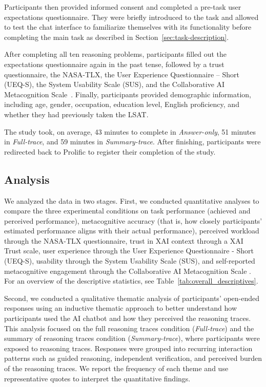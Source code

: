 \documentclass[manuscript, anonymous=false,authorversion,review=false]{acmart}
\begin{document}
Participants then provided informed consent and completed a pre-task user expectations questionnaire. They were briefly introduced to the task and allowed to test the chat interface to familiarize themselves with its functionality before completing the main task as described in Section~\ref{sec:task-description}.

After completing all ten reasoning problems, participants filled out the expectations questionnaire again in the past tense, followed by a trust questionnaire, the NASA-TLX, the User Experience Questionnaire -- Short (UEQ-S), the System Usability Scale (SUS), and the Collaborative AI Metacognition Scale~\cite{Sidra03042026}. Finally, participants provided demographic information, including age, gender, occupation, education level, English proficiency, and whether they had previously taken the LSAT.

The study took, on average, 43 minutes to complete in \textit{Answer-only}, 51 minutes in \textit{Full-trace}, and 59 minutes in \textit{Summary-trace}. After finishing, participants were redirected back to Prolific to register their completion of the study.


\subsection{Analysis}
We analyzed the data in two stages. First, we conducted quantitative analyses to compare the three experimental conditions on task performance (achieved and perceived performance), metacognitive accuracy (that is, how closely participants' estimated performance aligns with their actual performance), perceived workload through the NASA-TLX questionnaire, trust in XAI context through a XAI Trust scale, user experience through the User Experience Questionnaire - Short (UEQ-S), usability through the System Usability Scale (SUS), and self-reported metacognitive engagement through the Collaborative AI Metacognition Scale \cite{Sidra03042026}. For an overview of the descriptive statistics, see Table~\ref{tab:overall_descriptives}.

Second, we conducted a qualitative thematic analysis of participants’ open-ended responses using an inductive thematic approach \cite{clarke2017thematic} to better understand how participants used the AI chatbot and how they perceived the reasoning traces. This analysis focused on the full reasoning traces condition (\textit{Full-trace}) and the summary of reasoning traces condition (\textit{Summary-trace}), where participants were exposed to reasoning traces. Responses were grouped into recurring interaction patterns such as guided reasoning, independent verification, and perceived burden of the reasoning traces. We report the frequency of each theme and use representative quotes to interpret the quantitative findings.
\end{document}
